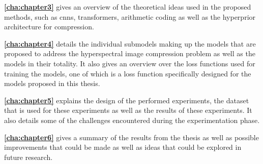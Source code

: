 \textbf{\autoref{cha:chapter3}} gives an overview of the theoretical ideas used in the proposed methods, such as \acp{cnn}, transformers, arithmetic coding as well as the hyperprior architecture for compression.

\textbf{\autoref{cha:chapter4}} details the individual submodels making up the models that are proposed to address the hyperspectral image compression problem as well as the models in their totality. It also gives an overview over the loss functions used for training the models, one of which is a loss function specifically designed for the models proposed in this thesis.

\textbf{\autoref{cha:chapter5}} explains the design of the performed experiments, the dataset that is used for these experiments as well as the results of these experiments. It also details some of the challenges encountered during the experimentation phase.

\textbf{\autoref{cha:chapter6}} gives a summary of the results from the thesis as well as possible improvements that could be made as well as ideas that could be explored in future research.